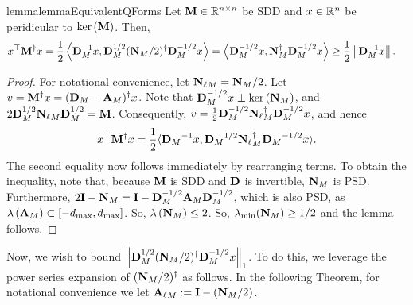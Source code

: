 \begin{restatable}{lemma}{lemmaEquivalentQForms}\label{lemma:lemmaEquivalentQForms} Let $\mathbf{M} \in \mathbb{R}^{n \times n}$ be SDD and $x \in \mathbb{R}^n$ be peridicular to $\mathrm{ker}\left(\mathbf{M}\right)$. Then, 
\begin{align*}
    x^\top \mathbf{M}^\dagger x &= \frac{1}{2}\left\langle {\mathbf{D}}_{M}^{-1}x, {\mathbf{D}}_{M}^{1/2} (\mathbf{N}_{M}/2)^{\dagger} {\mathbf{D}}_{M}^{-1/2} x\right\rangle = \left\langle {\mathbf{D}}_{M}^{-1/2}x, \mathbf{N}_{M}^{\dagger} {\mathbf{D}}_{M}^{-1/2} x\right\rangle 
    \geq \frac{1}{2} \left\|{\mathbf{D}}_{M}^{-1}x\right\|. 
\end{align*}
\end{restatable}
\begin{proof} For notational convenience, let ${\mathbf{N}_\ell}_{M} = \mathbf{N}_{M}/2$. Let $v = \mathbf{M}^\dagger x = ({\mathbf{D}}_{M}-{\mathbf{A}}_{M})^\dagger x$. Note that ${\mathbf{D}}_{M}^{-1/2}x \perp \mathrm{ker}\left(\mathbf{N}_{M}\right)$, and $2 {\mathbf{D}}_{M}^{1/2} {\mathbf{N}_\ell}_{M} {\mathbf{D}}_{M}^{1/2} = \mathbf{M}$. Consequently, $v = \frac{1}{2} {\mathbf{D}}_{M}^{-1/2}{\mathbf{N}_\ell}_{M}^\dagger {\mathbf{D}}_{M}^{-1/2} x$, and hence 
\begin{align*}
    x^\top \mathbf{M}^\dagger x = \frac{1}{2} \langle {{\mathbf{D}}_{M}}^{-1}x, {{\mathbf{D}}_{M}}^{1/2} {\mathbf{N}_\ell}_{M}^{\dagger} {{\mathbf{D}}_{M}}^{-1/2} x\rangle.
\end{align*}
The second equality now follows immediately by rearranging terms. To obtain the inequality, note that, because $\mathbf{M}$ is SDD and $\mathbf{D}$ is invertible, $\mathbf{N}_{M}$ is PSD. Furthermore, $2\mathbf{I} - \mathbf{N}_{M} = \mathbf{I} - {\mathbf{D}}_{M}^{-1/2} {\mathbf{A}}_{M} {\mathbf{D}}_{M}^{-1/2}$, which is also PSD, as $\lambda\left({\mathbf{A}}_{M}\right) \subset [-d_{\max}, d_{\max}]$. So, $\lambda\left(\mathbf{N}_{M}\right) \leq 2$. So, $\lambda_{\mathrm{min}}(\mathbf{N}_{M}) \geq 1/2$ and the lemma follows.  
\end{proof}

Now, we wish to bound $\left\Vert {\mathbf{D}}_{M}^{1/2} (\mathbf{N}_{M}/2)^{\dagger} {\mathbf{D}}_{M}^{-1/2} x \right\Vert_1$. To do this, we leverage the power series expansion of $(\mathbf{N}_{M}/2)^{\dagger}$ as follows. In the following Theorem, for notational convenience we let ${\mathbf{A}_\ell}_{M}:= \mathbf{I} - (\mathbf{N}_{M}/2)$. 

